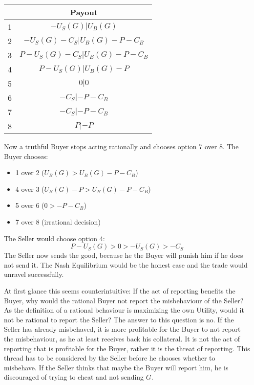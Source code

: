 \documentclass{cacthesis}
\begin{document}
\begin{center}
\begin{tabular}{ |c|c| }
\hline
& Payout  \\
\hline
\hline
1& $-U_S(G) | U_B(G)$\\
\hline
2& $-U_S(G) - C_S| U_B(G)- P - C_B $\\
\hline
3&$P-U_S(G) - C_S | U_B(G) -P - C_B$ \\
\hline
4& $P-U_S(G)| U_B(G)-P$\\
\hline
5& $0|0$\\
\hline 
6& $-C_S |-P - C_B$\\
\hline
7& $- C_S| -P-C_B$\\
\hline
8& $P| -P$\\
\hline
\end{tabular}
\end{center}
Now a truthful Buyer stops acting rationally and chooses option 7 over 8.\newline
The Buyer chooses:
\begin{itemize}
    \item 1 over 2 ($U_B(G) > U_B(G) -P -C_B$)
    \item 4 over 3 ($U_B(G) - P > U_B(G) -P -C_B$)
    \item 5 over 6 ($0 > -P -C_B$)
    \item 7 over 8 (irrational decision)
\end{itemize}
The Seller would choose option 4:
\[P-U_S(G)>0>-U_S(G)>-C_S\]
The Seller now sends the good, because he the Buyer will punish him if he does not send it.
The Nash Equilibrium would be the honest case and the trade would unravel successfully.\newline

At first glance this seems counterintuitive: If the act of reporting benefits the Buyer, why would the rational Buyer not report the misbehaviour of the Seller? As the definition of a rational behaviour is maximizing the own Utility, would it not be rational to report the Seller?
The answer to this question is no. If the Seller has already misbehaved, it is more profitable for the Buyer to not report the misbehaviour, as he at least receives back his collateral.
It is not the act of reporting that is profitable for the Buyer, rather it is
the threat of reporting. This thread has to be considered by the Seller before he chooses whether to misbehave. If the Seller thinks that maybe the Buyer will report him, he is discouraged of trying to cheat and not sending $G$.\newline
\end{document}
